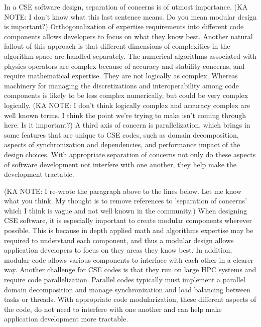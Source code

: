 In a CSE software design, separation of concerns is of utmost
importance. (KA NOTE:  I don't know what this last sentence means.  Do you mean modular design is important?)
Orthogonalization of expertise requirements into different code
components allows developers to focus on what they know best.  
Another natural fallout of this approach is that different dimensions of
complexities in the algorithm space are handled separately. The
numerical algorithms associated with physics operators are complex
because of accuracy and stability concerns, and require mathematical
expertise. They are not logically as complex. Whereas machinery for
managing the discretizations and interoperability among code
components is likely to be less complex numerically, but could be very
complex logically. (KA NOTE:  I don't think logically complex and accuracy complex are well known terms.  I think the point we're trying to make isn't coming through here.  Is it important?)  A third axis of concern is parallelization, which
brings in some features that are unique to CSE codes, such as domain
decomposition, aspects of synchronization and dependencies, and
performance impact of the design choices. With appropriate separation
of concerns not only do these aspects of software development not 
interfere with one another, they help make the development tractable. 

(KA NOTE: I re-wrote the paragraph above to the lines below.  Let me know what you think.  My thought is to remove references to 'separation of concerns' which I think is vague and not well known in the community.)
When designing CSE software, it is especially important to create modular components wherever possible.  This is because in depth applied math and algorithms expertise may be required to understand each component, and thus a modular design allows application developers to focus on they areas they know best.  In addition, modular code allows various components to interface with each other in a clearer way.  Another challenge for CSE codes is that they run on large HPC systems and require code parallelization.  Parallel codes typically must implement a parallel domain decomposition and manage synchronization and load balancing between tasks or threads.  With appropriate code modularization, these different aspects of the code, do not need to interfere with one another and can help make application development more tractable.


